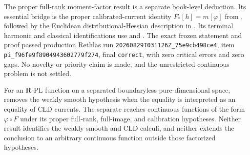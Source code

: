 The proper full-rank moment-factor result
 is a separate book-level deduction.
Its essential bridge is the proper calibrated-current identity
$F_*[h]=m[\varphi]$ from \cite[Proposition~5.10.1 and \S7.7.8]{CLD25},
followed by the Euclidean distributional-Hessian description in
\cite[\S1.6.4 and Proposition~8.3.2]{CLD25}.  Its terminal harmonic and
classical identifications use \cite[Definition~7.2 and
Remark~7.3(5),(6)]{GJR26} and
\cite[Proposition~7.2(2),(3)]{GR25Classical}.  The exact frozen statement and
proof passed production Rethlas run
\nolinkurl{20260829T031126Z_75e9cb498ce4}, item
\nolinkurl{pi_f96fe9f8904943602779f274}, final \texttt{correct}, with zero
critical errors and zero gaps.  No novelty or priority claim is made, and the
unrestricted continuous problem is not settled.

For an $\mathbf R$-PL function on a separated boundaryless pure-dimensional
space,  removes the weakly
smooth hypothesis when the equality is interpreted as an equality of CLD
currents.  The separate
 reaches continuous functions of the
form $\varphi\circ F$ under its proper full-rank, full-image, and calibration
hypotheses.  Neither result identifies the weakly smooth and CLD calculi, and
neither extends the conclusion to an arbitrary continuous function outside
those factorized hypotheses.
